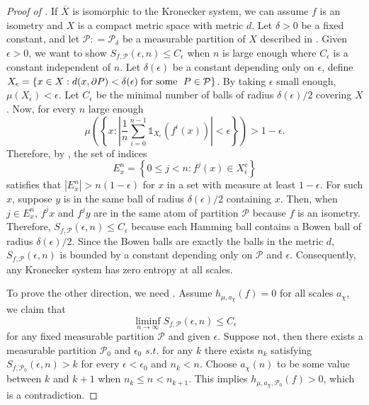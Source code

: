 \documentclass[oneside]{amsart}
\theoremstyle{plain}
\theoremstyle{definition}
\newcommand{\dfn}{\mathrel{\mathop:}=}
\newcommand{\<}{\langle}
\renewcommand{\>}{\rangle}
\renewcommand{\P}{\mathcal{P}}
\newcommand{\e}{\epsilon}
\renewcommand{\bar}{\overline}
\renewcommand{\|}{|\!|} %
\begin{document}
\begin{proof}[Proof of ]
 If $\bar{X}$ is isomorphic to the Kronecker system, we can assume $f$ is an isometry and $X$ is a compact metric space with metric $d$. Let $\delta >0$ be a fixed constant, and let $\P \dfn \P_\delta$ be a measurable partition of $X$ described in  . Given $\e>0$, we want to show $S_{f,\P}(\e,n)\leq C_\epsilon$ when $n$ is large enough where $C_\epsilon$ is a constant independent of $n$. Let \(\delta(\e)\) be a constant depending only on \(\e\), define $X_\epsilon=\{x\in X: d(x,\partial{P})<\delta(\e) \text{\;for some \;} P\in \P\}$. By taking \(\e\) small enough, $\mu(X_\epsilon)<\e$. Let $C_\epsilon$ be the minimal number of balls of radius
 $\delta(\e)/2$ covering $X$. Now, for every $n$ large enough
 \begin{equation}
     \mu\left(\left\{ x: \left|\frac{1}{n} \sum_{i=0}^{n-1}\mathds{1}_{X_{\epsilon}}(f^i(x))\right|<\epsilon\right\}\right)>1-\epsilon.
     \label{eq:NOfBoundary}
 \end{equation}
 Therefore, by , the set of indices 
 \begin{equation*}
 E_x^n=\left\{0\leq j <n: f^j(x)\in X_{\epsilon}^c \right\}
 \end{equation*}
 satisfies that $|E_x^n| > n(1-\epsilon)$
 for $x$ in a set with measure at least $1-\epsilon$. For such $x$, suppose $y$ is in the same ball of radius $\delta(\e)/2$ containing $x$. Then, when $j\in E_x^n$, $f^j x$ and $f^jy$ are in the same atom of partition $\P$ because $f$ is an isometry.  Therefore, $S_{f,\P}(\e,n)\leq C_\epsilon$ because each Hamming ball contains a Bowen ball of radius $\delta(\e)/2$. Since the Bowen balls are exactly the balls in the metric $d$, $S_{f,\P}(\e,n)$ is bounded by a constant depending only on $\mathcal P$ and $\e$. Consequently, any Kronecker system has zero entropy at all scales.
 
 To prove the other direction, we need .
 Assume $h_{\mu,a_\chi}(f)=0$ for all scales $a_\chi$, we claim that \[\displaystyle\liminf_{n\rightarrow \infty}S_{f,\P}(\e,n)\leq C_\epsilon\] for any fixed measurable partition $\P$ and given $\e$. Suppose not, then there exists a measurable partition $\P_0$ and $\e_0$ $s.t.$ for any $k$ there exists $n_k$ satisfying 
$S_{f,\P_0}(\e,n)>k$ for every $\e<\e_0$ and $n_k<n$. Choose $a_{\chi}(n)$ to be some value between $k$ and $k+1$ when $n_k\leq n< n_{k+1}$. This implies $h_{\mu,a_{\chi},\P_0}(f)>0$, which is a contradiction. 


\end{proof}
\end{document}
